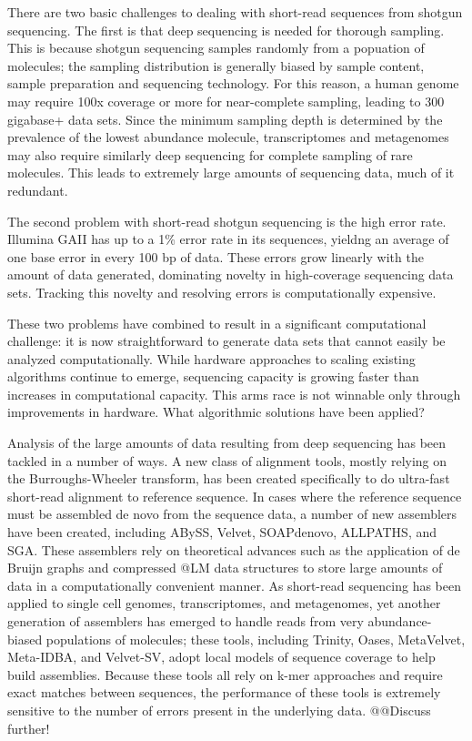 \documentclass[10pt]{article}
\begin{document}
There are two basic challenges to dealing with short-read sequences
from shotgun sequencing. The first is that deep sequencing is needed
for thorough sampling. This is because shotgun sequencing samples
randomly from a popuation of molecules; the sampling distribution is
generally biased by sample content,
sample preparation and sequencing technology.  For this reason, a
human genome may require 100x coverage or more for near-complete
sampling, leading to 300 gigabase+ data sets.  Since the minimum sampling depth
is determined by the prevalence of the lowest abundance molecule, transcriptomes and
metagenomes may also require similarly deep sequencing for complete
sampling of rare molecules. This leads to extremely large amounts of
sequencing data, much of it redundant.

The second problem with short-read shotgun sequencing is the high
error rate.  Illumina GAII has up to a 1\% error rate in its
sequences, yieldng an average of one base error in every 100 bp of
data.  These errors grow linearly with the amount of data generated,
dominating novelty in high-coverage sequencing data sets.  Tracking this
novelty and resolving errors is computationally expensive.

These two problems have combined to result in a significant
computational challenge: it is now straightforward to generate data
sets that cannot easily be analyzed computationally.  While hardware approaches
to scaling existing algorithms continue to emerge, sequencing capacity
is growing faster than increases in computational capacity.
This arms race is not winnable only through improvements
in hardware.  What algorithmic solutions have been applied?

Analysis of the large amounts of data resulting from deep sequencing
has been tackled in a number of ways.  A new class of alignment tools,
mostly relying on the Burroughs-Wheeler transform, has been created
specifically to do ultra-fast short-read alignment to reference
sequence.  In cases where the reference sequence must be assembled de
novo from the sequence data, a number of new assemblers have been
created, including ABySS, Velvet, SOAPdenovo, ALLPATHS, and SGA.
These assemblers rely on theoretical advances such as the application
of de Bruijn graphs and compressed @LM data structures to store large
amounts of data in a computationally convenient manner.  As short-read
sequencing has been applied to single cell genomes, transcriptomes,
and metagenomes, yet another generation of assemblers has emerged to
handle reads from very abundance-biased populations of molecules;
these tools, including Trinity, Oases, MetaVelvet, Meta-IDBA, and
Velvet-SV, adopt local models of sequence coverage to help build
assemblies.  Because these tools all rely on k-mer approaches and
require exact matches between sequences, the performance of these
tools is extremely sensitive to the number of errors present in the
underlying data. @@Discuss further!
\end{document}
